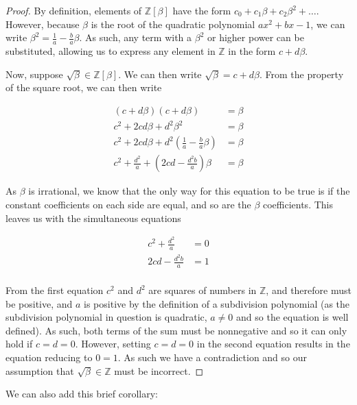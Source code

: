 \documentclass[
11pt, %
english, %
singlespacing, %
parskip, %
headsepline, %
]{amsart} %
\theoremstyle{definition}
\begin{document}
\begin{proof}
By definition,  elements of $\mathbb{Z}[\beta]$ have the form $c_0 + c_1 \beta + c_2 \beta^2 + \dots$. However, because $\beta$ is the root of the quadratic polynomial $ax^2+bx-1$, we can write $\beta^2 = \frac{1}{a} - \frac{b}{a} \beta$. As such, any term with a $\beta^2$ or higher power can be substituted, allowing us to express any element in $\mathbb{Z}$ in the form $c+d \beta$.

Now, suppose $\sqrt{\beta} \in \mathbb{Z}[\beta]$. We can then write $\sqrt{\beta} = c+d \beta$. From the property of the square root, we can then write

\begin{equation}
\begin{aligned}
(c+ d \beta)(c+d \beta) & = \beta \\
c^2 +2cd \beta + d^2 \beta^2  & = \beta \\
c^2 +2cd \beta +d^2 (\frac{1}{a}-\frac{b}{a} \beta) & = \beta \\
c^2 + \frac{d^2}{a} + (2cd - \frac{d^2 b}{a}) \beta & = \beta 
\end{aligned}
\end{equation}

As $\beta$ is irrational, we know that the only way for this equation to be true is if the constant coefficients on each side are equal, and so are the $\beta$ coefficients. This leaves us with the simultaneous equations

\begin{equation}
\begin{aligned}
c^2 + \frac{d^2}{a} & = 0 \\
2cd - \frac{d^2 b}{a} & = 1 \\
\end{aligned}
\end{equation}

From the first equation $c^2$ and $d^2$ are squares of numbers in $\mathbb{Z}$, and therefore must be positive, and $a$ is positive by the definition of a subdivision polynomial (as the subdivision polynomial in question is quadratic, $a \neq 0$ and so the equation is well defined). As such, both terms of the sum must be nonnegative and so it can only hold if $c=d=0$. However, setting $c=d=0$ in the second equation results in the equation reducing to $0=1$. As such we have a contradiction and so our assumption that $\sqrt{\beta} \in \mathbb{Z}$ must be incorrect.
\end{proof}

We can also add this brief corollary:
\end{document}
